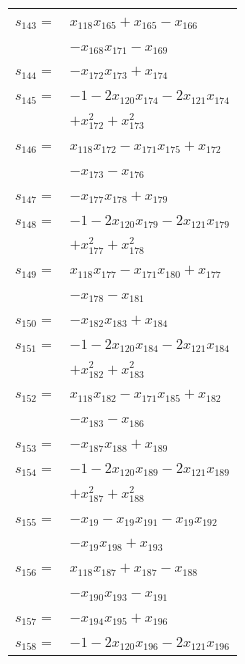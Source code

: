 \begin{longtable}{@{}r@{\;}l@{}}
\(s_{143}=\) & \(\displaystyle x_{118}x_{165} +x_{165} -x_{166}\) \\
 & \(\displaystyle -x_{168}x_{171} -x_{169}\) \\[3pt]
\(s_{144}=\) & \(\displaystyle -x_{172}x_{173} +x_{174}\) \\[3pt]
\(s_{145}=\) & \(\displaystyle -1 -2x_{120}x_{174} -2x_{121}x_{174}\) \\
 & \(\displaystyle +x_{172}^{2} +x_{173}^{2}\) \\[3pt]
\(s_{146}=\) & \(\displaystyle x_{118}x_{172} -x_{171}x_{175} +x_{172}\) \\
 & \(\displaystyle -x_{173} -x_{176}\) \\[3pt]
\(s_{147}=\) & \(\displaystyle -x_{177}x_{178} +x_{179}\) \\[3pt]
\(s_{148}=\) & \(\displaystyle -1 -2x_{120}x_{179} -2x_{121}x_{179}\) \\
 & \(\displaystyle +x_{177}^{2} +x_{178}^{2}\) \\[3pt]
\(s_{149}=\) & \(\displaystyle x_{118}x_{177} -x_{171}x_{180} +x_{177}\) \\
 & \(\displaystyle -x_{178} -x_{181}\) \\[3pt]
\(s_{150}=\) & \(\displaystyle -x_{182}x_{183} +x_{184}\) \\[3pt]
\(s_{151}=\) & \(\displaystyle -1 -2x_{120}x_{184} -2x_{121}x_{184}\) \\
 & \(\displaystyle +x_{182}^{2} +x_{183}^{2}\) \\[3pt]
\(s_{152}=\) & \(\displaystyle x_{118}x_{182} -x_{171}x_{185} +x_{182}\) \\
 & \(\displaystyle -x_{183} -x_{186}\) \\[3pt]
\(s_{153}=\) & \(\displaystyle -x_{187}x_{188} +x_{189}\) \\[3pt]
\(s_{154}=\) & \(\displaystyle -1 -2x_{120}x_{189} -2x_{121}x_{189}\) \\
 & \(\displaystyle +x_{187}^{2} +x_{188}^{2}\) \\[3pt]
\(s_{155}=\) & \(\displaystyle -x_{19} -x_{19}x_{191} -x_{19}x_{192}\) \\
 & \(\displaystyle -x_{19}x_{198} +x_{193}\) \\[3pt]
\(s_{156}=\) & \(\displaystyle x_{118}x_{187} +x_{187} -x_{188}\) \\
 & \(\displaystyle -x_{190}x_{193} -x_{191}\) \\[3pt]
\(s_{157}=\) & \(\displaystyle -x_{194}x_{195} +x_{196}\) \\[3pt]
\(s_{158}=\) & \(\displaystyle -1 -2x_{120}x_{196} -2x_{121}x_{196}\) \\

\end{longtable}
